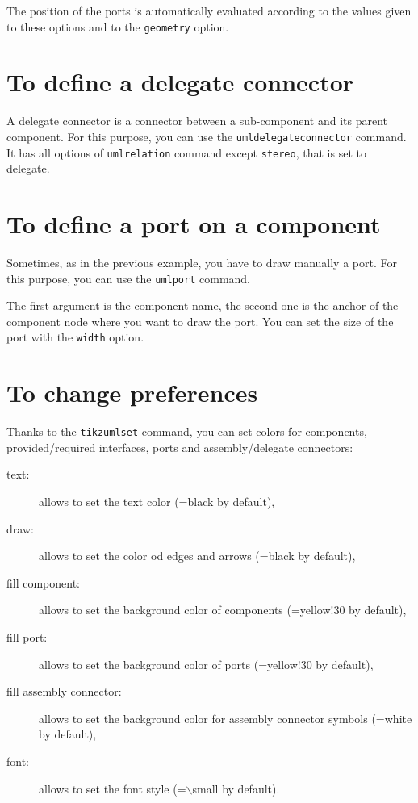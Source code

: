 \documentclass[a4paper,11pt]{report}
\begin{document}
\medskip

The position of the ports is automatically evaluated according to the values given to these options and to the {\tt geometry} option.

\section{To define a delegate connector}

A delegate connector is a connector between a sub-component and its parent component. For this purpose, you can use the {\tt umldelegateconnector} command. It has all options of {\tt umlrelation} command except {\tt stereo}, that is set to delegate.

\medskip

\begin{minipage}{0.45\textwidth}
	
\end{minipage}
\begin{minipage}{0.55\textwidth}
	\begin{center}
	\end{center}
\end{minipage}

\medskip

\section{To define a port on a component}

Sometimes, as in the previous example, you have to draw manually a port. For this purpose, you can use the {\tt umlport} command.

The first argument is the component name, the second one is the anchor of the component node where you want to draw the port. You can set the size of the port with the {\tt width} option.

\section{To change preferences}

Thanks to the {\tt tikzumlset} command, you can set colors for components, provided/required interfaces, ports and assembly/delegate connectors:

\begin{description}
	\item[text:] allows to set the text color (=black by default),
	\item[draw:] allows to set the color od edges and arrows (=black by default),
	\item[fill component:] allows to set the background color of components (=yellow!30 by default),
	\item[fill port:] allows to set the background color of ports (=yellow!30 by default),
	\item[fill assembly connector:] allows to set the background color for assembly connector symbols (=white by default),
	\item[font:] allows to set the font style (=$\backslash$small by default).
\end{description}
\end{document}
